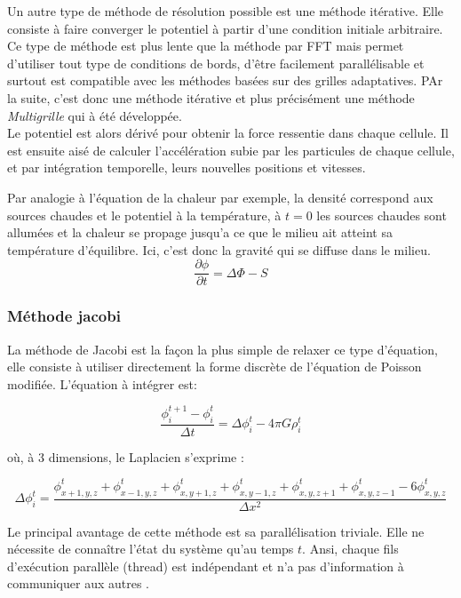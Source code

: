 Un autre type de méthode de résolution possible est une méthode itérative. Elle consiste à faire converger le potentiel à partir d'une condition initiale arbitraire. Ce type de méthode est plus lente que la méthode par FFT mais  permet d'utiliser tout type de conditions de bords, d'être facilement parallélisable et surtout est compatible avec les méthodes basées sur des grilles adaptatives. PAr la suite, c'est donc une méthode itérative et plus précisément une méthode \emph{Multigrille} qui à été développée.\\

Le potentiel est alors dérivé pour obtenir la force ressentie dans chaque cellule. Il est ensuite aisé de calculer l'accélération subie par les particules de chaque cellule, et par intégration temporelle, leurs nouvelles positions et vitesses.

Par analogie à l'équation de la chaleur par exemple, la densité correspond aux sources chaudes et le potentiel à la température, à $t=0$ les sources chaudes sont allumées et la chaleur se propage jusqu'a ce que le milieu ait atteint sa température d'équilibre. Ici, c'est donc la gravité qui se diffuse dans le milieu. \\


\begin{equation}
\dfrac{\partial \phi}{\partial t} = \Delta \Phi -S 
\end{equation}


\subsubsection{Méthode jacobi}


La méthode de Jacobi est la façon la plus simple de relaxer ce type d'équation, elle consiste à utiliser directement la forme discrète de l'équation de Poisson modifiée. L'équation à intégrer est:

\[ \dfrac{\phi^{t+1}_i - \phi^{t}_i}{\Delta t}  =  \Delta \phi_i^t - 4 \pi G \rho^t_i \]

où, à 3 dimensions, le Laplacien s'exprime :

\[ \Delta \phi_i^t = \dfrac{\phi_{x+1,y,z}^t  + \phi_{x-1,y,z}^t + \phi_{x,y+1,z}^t  + \phi_{x,y-1,z}^t + \phi_{x,y,z+1}^t + \phi_{x,y,z-1}^t	- 6\phi_{x,y,z}^t}{\Delta x ^2} \]
		
Le principal avantage de cette méthode est sa parallélisation triviale. 
Elle ne nécessite de connaître l'état du système qu'au temps $t$. 
Ansi, chaque fils d'exécution parallèle (thread) est indépendant et n'a pas d'information à communiquer aux autres .




